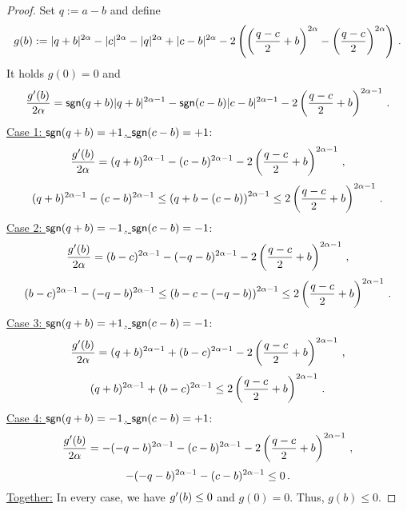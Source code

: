 \begin{proof}
	Set $q:= a-b$ and define
	\begin{equation*}
		g(b) :=  |q+b|^{2\alpha}-|c|^{2\alpha}-|q|^{2\alpha}+|c-b|^{2\alpha} - 2\left( \left( \frac{q-c}{2}+b \right)^{2\alpha}-\left( \frac{q-c}{2} \right)^{2\alpha} \right)
		\, .
	\end{equation*}
	It holds $g(0)=0$
	and
	\begin{equation*}
		\frac{g^\prime(b)}{2\alpha} = \mathsf{sgn}(q+b)|q+b|^{2\alpha-1}-\mathsf{sgn}(c-b)|c-b|^{2\alpha-1} -
						2\left( \frac{q-c}{2}+b \right)^{2\alpha-1}
		\, .
	\end{equation*}
	\underline{Case 1: $\mathsf{sgn}(q+b) = +1$, $\mathsf{sgn}(c-b)=+1$}:
		\begin{equation*}
			\frac{g^\prime(b)}{2\alpha} = (q+b)^{2\alpha-1}-(c-b)^{2\alpha-1} -
							2\left( \frac{q-c}{2}+b \right)^{2\alpha-1}
			\, ,
		\end{equation*}
		\begin{equation*}
			(q+b)^{2\alpha-1}-(c-b)^{2\alpha-1} \leq \left( q+b-(c-b) \right)^{2\alpha-1}\leq 2\left( \frac{q-c}{2}+b \right)^{2\alpha-1}
			\, .
		\end{equation*}
	\underline{Case 2: $\mathsf{sgn}(q+b) = -1$, $\mathsf{sgn}(c-b)=-1$}:
		\begin{equation*}
			\frac{g^\prime(b)}{2\alpha} = (b-c)^{2\alpha-1}-(-q-b)^{2\alpha-1}
							-2\left( \frac{q-c}{2}+b \right)^{2\alpha-1}
			\, ,
		\end{equation*}
		\begin{equation*}
			(b-c)^{2\alpha-1}-(-q-b)^{2\alpha-1} \leq \left( b-c-(-q-b) \right)^{2\alpha-1}\leq 2\left( \frac{q-c}{2}+b \right)^{2\alpha-1}
			\, .
		\end{equation*}
	\underline{Case 3: $\mathsf{sgn}(q+b) = +1$, $\mathsf{sgn}(c-b)=-1$}:
		\begin{equation*}
			\frac{g^\prime(b)}{2\alpha} = (q+b)^{2\alpha-1}+(b-c)^{2\alpha-1} -
									2\left( \frac{q-c}{2}+b \right)^{2\alpha-1}
									\, ,
		\end{equation*}
		\begin{equation*}
			(q+b)^{2\alpha-1}+(b-c)^{2\alpha-1} \leq 2\left( \frac{q-c}{2}+b \right)^{2\alpha-1}
			\, .
		\end{equation*}
	\underline{Case 4: $\mathsf{sgn}(q+b) = -1$, $\mathsf{sgn}(c-b)=+1$}:
		\begin{equation*}
			\frac{g^\prime(b)}{2\alpha} = -(-q-b)^{2\alpha-1}-(c-b)^{2\alpha-1} -
									2\left( \frac{q-c}{2}+b \right)^{2\alpha-1}
									\, ,
		\end{equation*}
		\begin{equation*}
			-(-q-b)^{2\alpha-1}-(c-b)^{2\alpha-1} \leq 0
			\, .
		\end{equation*}
	\underline{Together:}
	In every case, we have $g^\prime(b) \leq 0$ and $g(0)=0$. Thus, $g(b) \leq 0$.
\end{proof}
%
%
%
